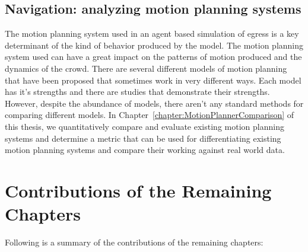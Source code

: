 \subsection{Navigation: analyzing motion planning systems}
\label{IBEVAC:NavigationShortcomings}

    The motion planning system used in an agent based simulation of egress is a key determinant of the kind of behavior produced by the model. The motion planning system used can have a great impact on the patterns of motion produced and the dynamics of the crowd.
    There are several different models of motion planning that have been proposed that sometimes work in very different ways. Each model has it's strengths and there are studies that demonstrate their strengths. However, despite the abundance of models, there aren't any standard methods for comparing different models.
    In Chapter~\ref{chapter:MotionPlannerComparison} of this thesis, we quantitatively compare and evaluate existing motion planning systems and determine a metric that can be used for differentiating existing motion planning systems and compare their working against real world data.






\section{Contributions of the Remaining Chapters}
\label{IBEVAC:Contributions}

Following is a summary of the contributions of the remaining chapters:


